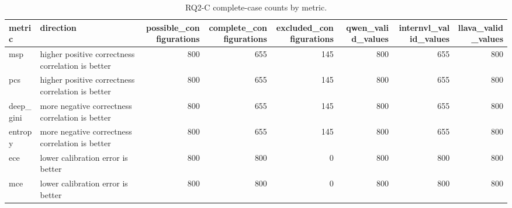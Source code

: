 \begin{table}[tbp]
\caption{RQ2-C complete-case counts by metric.}
\label{tab:rq2c-dataset-summary}
\begin{tabular}{llrrrrrr}
\toprule
metric & direction & possible\_configurations & complete\_configurations & excluded\_configurations & qwen\_valid\_values & internvl\_valid\_values & llava\_valid\_values \\
\midrule
msp & higher positive correctness correlation is better & 800 & 655 & 145 & 800 & 655 & 800 \\
pcs & higher positive correctness correlation is better & 800 & 655 & 145 & 800 & 655 & 800 \\
deep\_gini & more negative correctness correlation is better & 800 & 655 & 145 & 800 & 655 & 800 \\
entropy & more negative correctness correlation is better & 800 & 655 & 145 & 800 & 655 & 800 \\
ece & lower calibration error is better & 800 & 800 & 0 & 800 & 800 & 800 \\
mce & lower calibration error is better & 800 & 800 & 0 & 800 & 800 & 800 \\
\bottomrule
\end{tabular}
\end{table}
